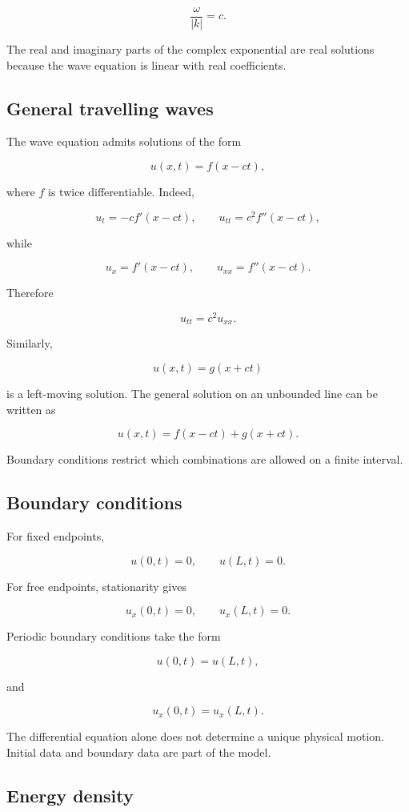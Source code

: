 \[
\frac{\omega}{|k|}=c.
\]

The real and imaginary parts of the complex exponential are real solutions because the wave equation is linear with real coefficients.

\subsection{General travelling waves}

The wave equation admits solutions of the form

\[
u(x,t)=f(x-ct),
\]

where \(f\) is twice differentiable. Indeed,

\[
u_{t}=-cf'(x-ct),
\qquad
u_{tt}=c^{2}f''(x-ct),
\]

while

\[
u_{x}=f'(x-ct),
\qquad
u_{xx}=f''(x-ct).
\]

Therefore

\[
u_{tt}=c^{2}u_{xx}.
\]

Similarly,

\[
u(x,t)=g(x+ct)
\]

is a left-moving solution. The general solution on an unbounded line can be written as

\[
\boxed{
u(x,t)=f(x-ct)+g(x+ct)
}.
\]

Boundary conditions restrict which combinations are allowed on a finite interval.

\subsection{Boundary conditions}

For fixed endpoints,

\[
u(0,t)=0,
\qquad
u(L,t)=0.
\]

For free endpoints, stationarity gives

\[
u_{x}(0,t)=0,
\qquad
u_{x}(L,t)=0.
\]

Periodic boundary conditions take the form

\[
u(0,t)=u(L,t),
\]

and

\[
u_{x}(0,t)=u_{x}(L,t).
\]

The differential equation alone does not determine a unique physical motion. Initial data and boundary data are part of the model.

\subsection{Energy density}

